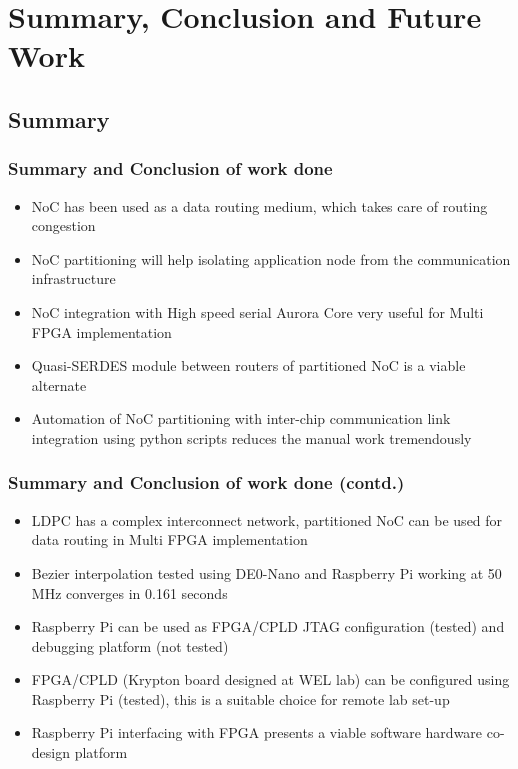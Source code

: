 \section{Summary, Conclusion and Future Work}
\subsection{Summary}
\begin{frame}
\frametitle {Summary and Conclusion of work done}
\begin {center}
\begin{itemize}
\item NoC has been used as a data routing medium, which takes care of routing congestion
\item NoC partitioning will help isolating application node from the communication infrastructure
\item NoC integration with High speed serial Aurora Core very useful for Multi FPGA implementation
\item Quasi-SERDES module between routers of partitioned NoC is a viable alternate
\item Automation of NoC partitioning with inter-chip communication link integration using python scripts reduces the manual work tremendously
\end {itemize}
\end{center}
\end {frame}


\begin {frame}
\frametitle {Summary and Conclusion of work done (contd.)}
\begin {center}
\begin {itemize}
\item LDPC has a complex interconnect network, partitioned NoC can be used for data routing in Multi FPGA implementation
\item Bezier interpolation tested using DE0-Nano and Raspberry Pi working at 50 MHz converges in 0.161 seconds
\item Raspberry Pi can be used as FPGA/CPLD JTAG configuration (tested) and debugging platform (not tested)
\item FPGA/CPLD (Krypton board designed at WEL lab) can be configured using Raspberry Pi (tested), this is a suitable choice for remote lab set-up
\item Raspberry Pi interfacing with FPGA presents a viable software hardware co-design platform
\end {itemize}
\end{center}

\normalsize
\end {frame}

